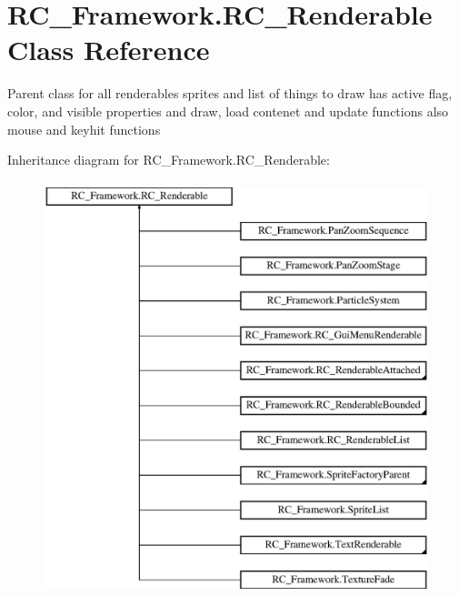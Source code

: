 \hypertarget{class_r_c___framework_1_1_r_c___renderable}{}\section{R\+C\+\_\+\+Framework.\+R\+C\+\_\+\+Renderable Class Reference}
\label{class_r_c___framework_1_1_r_c___renderable}


Parent class for all renderables sprites and list of things to draw has active flag, color, and visible properties and draw, load contenet and update functions also mouse and keyhit functions  


Inheritance diagram for R\+C\+\_\+\+Framework.\+R\+C\+\_\+\+Renderable\+:\begin{figure}[H]
\begin{center}
\leavevmode
\includegraphics[height=12.000000cm]{class_r_c___framework_1_1_r_c___renderable}
\end{center}
\end{figure}
